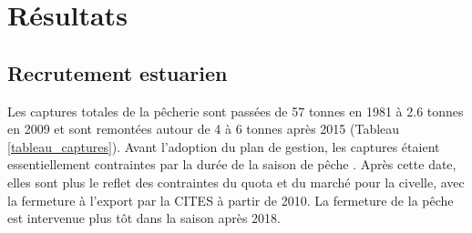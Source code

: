 \documentclass[10pt,twocolumn,titlepage,twoside]{article}\usepackage[]{graphicx}\usepackage[]{xcolor}
\begin{document}
\section{Résultats}


\subsection{ Recrutement estuarien}


Les captures totales de la pêcherie sont passées de 57 tonnes en
1981 à  2.6 tonnes en 2009 et sont remontées autour de 4 à 6 tonnes
après 2015 (Tableau \ref{tableau_captures}).
Avant l'adoption du plan de gestion, les captures étaient essentiellement contraintes par la durée de la saison de pêche
\citep{briand_dynamique_2009}. Après cette date, elles sont plus le reflet des
contraintes du quota et du marché pour la civelle, avec la fermeture à l'export
par la CITES à partir de 2010. La fermeture de la pêche est intervenue plus tôt
dans la saison après 2018.
\small
\end{document}
